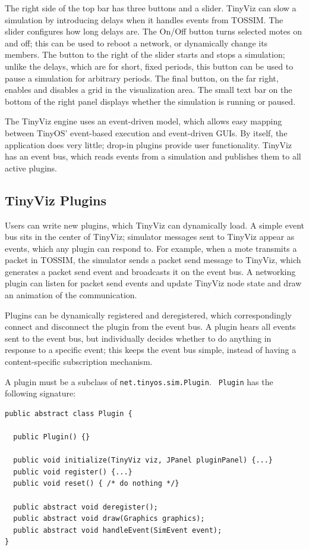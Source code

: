 \documentclass[10pt,fleqn]{article}
\def\sim{TOSSIM\xspace}
\def\tinyviz{TinyViz\xspace}
\begin{document}
The right side of the top bar has three buttons and a slider. \tinyviz
can slow a simulation by introducing delays when it handles events
from \sim. The slider configures how long delays are. The On/Off
button turns selected motes on and off; this can be used to reboot a
network, or dynamically change its members. The button to the right of
the slider starts and stops a simulation; unlike the delays, which are
for short, fixed periods, this button can be used to pause a
simulation for arbitrary periods. The final button, on the far right,
enables and disables a grid in the visualization area. The small text
bar on the bottom of the right panel displays whether the simulation
is running or paused.

The \tinyviz engine uses an event-driven model, which allows easy
mapping between TinyOS' event-based execution and event-driven
GUIs. By itself, the application does very little; drop-in plugins
provide user functionality. \tinyviz has an event bus, which reads
events from a simulation and publishes them to all active plugins.

\subsection{\tinyviz Plugins}
\label{sec:plugins}

Users can write new plugins, which \tinyviz can dynamically load.  A
simple event bus sits in the center of \tinyviz; simulator messages
sent to \tinyviz appear as events, which any plugin can respond
to. For example, when a mote transmits a packet in \sim, the simulator
sends a packet send message to \tinyviz, which generates a packet send
event and broadcasts it on the event bus. A networking plugin can
listen for packet send events and update \tinyviz node state and draw
an animation of the communication.

Plugins can be dynamically registered and deregistered, which
correspondingly connect and disconnect the plugin from the event
bus. A plugin hears all events sent to the event bus, but individually
decides whether to do anything in response to a specific event; this
keeps the event bus simple, instead of having a content-specific
subscription mechanism.

A plugin must be a subclass of {\tt net.tinyos.sim.Plugin}. {\tt
Plugin} has the following signature:

\begin{verbatim}
public abstract class Plugin {

  public Plugin() {}

  public void initialize(TinyViz viz, JPanel pluginPanel) {...}
  public void register() {...}
  public void reset() { /* do nothing */}

  public abstract void deregister();
  public abstract void draw(Graphics graphics);
  public abstract void handleEvent(SimEvent event);
}
\end{verbatim}
\end{document}

